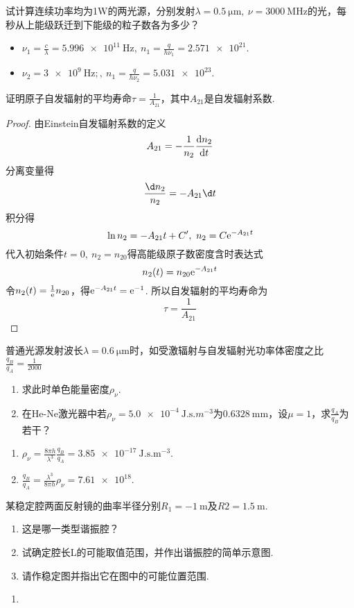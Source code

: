 \begin{problem}
	试计算连续功率均为1W的两光源，分别发射$\lambda=\qty{0.5}{\um},\ \nu=\qty{3000}{\MHz}$的光，每秒从上能级跃迁到下能级的粒子数各为多少？
\end{problem}
\begin{solution}
\begin{itemize}
	\item $\nu_1=\frac{c}{\lambda}=\qty{5.996e11}{\Hz},\ n_1=\frac{q}{h\nu_1}=\num{2.571e21}$.
	\item $\nu_2=\qty{3e9}{\Hz};,\ n_1=\frac{q}{h\nu_2}=\num{5.031e23}$.
\end{itemize}
\end{solution}

\begin{problem}
	证明原子自发辐射的平均寿命$\tau=\frac{1}{A_{21}}$，其中$A_{21}$是自发辐射系数.
\end{problem}
\begin{proof}
	由Einstein自发辐射系数的定义
	\[A_{21}=-\frac{1}{n_2}\odv{n_2}{t}\]
	分离变量得
	\[\frac{\d n_2}{n_2}=-A_{21}\d t\]
	积分得
	\[\ln n_2=-A_{21}t+C',\ n_2=C\e^{-A_{21}t}\]
	代入初始条件$t=0,\ n_2=n_{20}$得高能级原子数密度含时表达式
	\[n_2(t)=n_{20}\mathrm{e}^{-A_{21}t}\]
	令$n_2(t)=\frac{1}{\mathrm{e}}n_{20}$，得$\mathrm{e}^{-A_{21}t}=\mathrm{e}^{-1}$. 所以自发辐射的平均寿命为
	\[\tau=\frac{1}{A_{21}}\]
\end{proof}

\begin{problem}
	普通光源发射波长$\lambda=\qty{0.6}{\um}$时，如受激辐射与自发辐射光功率体密度之比$\frac{q_B}{q_A}=\frac{1}{2000}$
\begin{enumerate}
	\item 求此时单色能量密度$\rho_\nu$.
	\item 在He-Ne激光器中若$\rho_\nu=\qty{5.0e-4}{\J.\s.m^{-3}}$为$\qty{0.6328}{\mm}$，设$\mu=1$，求$\frac{q_A}{q_B}$为若干？
\end{enumerate}
\end{problem}
\begin{solution}
\begin{enumerate}
	\item $\rho_\nu=\frac{8\pi h}{\lambda^3}\frac{q_B}{q_A}=\qty{3.85e-17}{\J.\s.\m^{-3}}$.
	\item $\frac{q_B}{q_A}=\frac{\lambda^3}{8\pi h}\rho_\nu=\num{7.61e18}$.
\end{enumerate}
\end{solution}

\begin{problem}
	某稳定腔两面反射镜的曲率半径分别$R_1=\qty{-1}{\m}$及$R2=\qty{1.5}{\m}$.
	\begin{enumerate}
		\item 这是哪一类型谐振腔？
		\item 试确定腔长L的可能取值范围，并作出谐振腔的简单示意图.
		\item 请作稳定图并指出它在图中的可能位置范围.
	\end{enumerate}
\end{problem}
\begin{solution}
\begin{enumerate}
	\item 
\end{enumerate}
\end{solution}